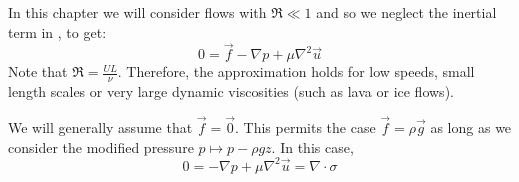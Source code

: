 \documentclass[../Main.tex]{subfiles}
\begin{document}
In this chapter we will consider flows with $\Re \ll 1$ and so we neglect the inertial term in , to get:
\begin{equation}
    0 = \vec{f} - \nabla p + \mu \nabla^2 \vec{u}
    \label{eqnStokes}
\end{equation}
Note that $\Re = \frac{UL}{\nu}$. Therefore, the approximation holds for low speeds, small length scales or very large dynamic viscosities (such as lava or ice flows).

We will generally assume that $\vec{f} = \vec0$. This permits the case $\vec{f} = \rho \vec{g}$ as long as we consider the modified pressure $p \mapsto p - \rho g z$. In this case,
\begin{equation}
    0 = -\nabla p + \mu \nabla^2 \vec{u} = \nabla \cdot \sigma
    \label{eqnStokesNoF}
\end{equation}
\end{document}
